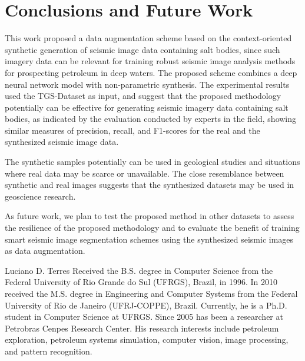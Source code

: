 \documentclass{ieeeaccess}
\begin{document}
\section{Conclusions and Future Work}

This work proposed a data augmentation scheme based on the context-oriented synthetic generation of seismic image data containing salt bodies, since such imagery data can be relevant for training robust seismic image analysis methods for prospecting petroleum in deep waters. The proposed scheme combines a deep neural network model with non-parametric synthesis. The experimental results used the TGS-Dataset as input, and suggest that the proposed methodology potentially can be effective for generating seismic imagery data containing salt bodies, as indicated by the evaluation conducted by experts in the field, showing similar measures of precision, recall, and F1-scores for the real and the synthesized seismic image data. 

The synthetic samples potentially can be used in geological studies and situations where real data may be scarce or unavailable. The close resemblance between synthetic and real images suggests that the synthesized datasets may be used in geoscience research.

As future work, we plan to test the proposed method in other datasets to assess the resilience of the proposed methodology and to evaluate the benefit of training smart seismic image segmentation schemes using the synthesized seismic images as data augmentation.


\printbibliography %

\begin{IEEEbiography}{Luciano D. Terres}
Received the B.S. degree in Computer Science from the Federal University of Rio
Grande do Sul (UFRGS), Brazil, in 1996. In 2010 received the M.S. degree in
Engineering and Computer Systems from the Federal University of Rio de Janeiro (UFRJ-COPPE), Brazil.
Currently, he is a Ph.D. student in Computer Science at UFRGS. Since 2005 has been a researcher at Petrobras Cenpes Research Center.
His research interests include petroleum exploration, petroleum systems simulation, computer vision, image processing, and pattern recognition.

\end{IEEEbiography}
\end{document}
